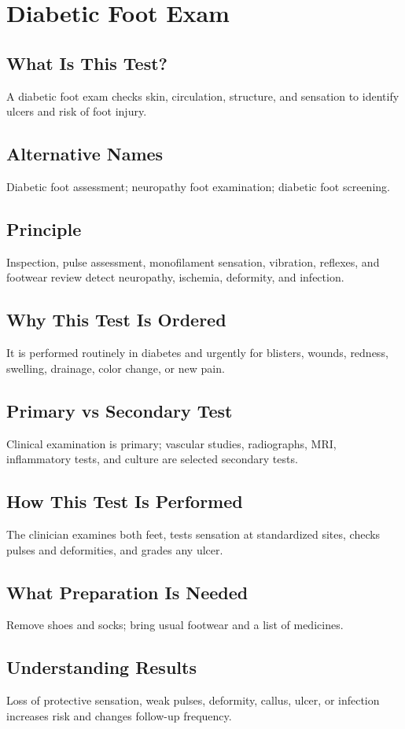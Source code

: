 \chapter{Diabetic Foot Exam}
\section*{What Is This Test?} A diabetic foot exam checks skin, circulation, structure, and sensation to identify ulcers and risk of foot injury.
\section*{Alternative Names} Diabetic foot assessment; neuropathy foot examination; diabetic foot screening.
\section*{Principle} Inspection, pulse assessment, monofilament sensation, vibration, reflexes, and footwear review detect neuropathy, ischemia, deformity, and infection.
\section*{Why This Test Is Ordered} It is performed routinely in diabetes and urgently for blisters, wounds, redness, swelling, drainage, color change, or new pain.
\section*{Primary vs Secondary Test} Clinical examination is primary; vascular studies, radiographs, MRI, inflammatory tests, and culture are selected secondary tests.
\section*{How This Test Is Performed} The clinician examines both feet, tests sensation at standardized sites, checks pulses and deformities, and grades any ulcer.
\section*{What Preparation Is Needed} Remove shoes and socks; bring usual footwear and a list of medicines.
\section*{Understanding Results} Loss of protective sensation, weak pulses, deformity, callus, ulcer, or infection increases risk and changes follow-up frequency.
